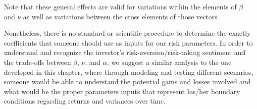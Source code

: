 Note that these general effects are valid for variations within the elements of $\beta$ and $\nu$ as well as variations between the cross elements of those vectors.

Nonetheless, there is no standard or scientific procedure to determine the exactly coefficients that someone should use as inputs for our risk parameters. In order to understand and recognize the investor's risk-aversion/risk-taking sentiment and the trade-offs between $\beta$, $\nu$, and $\alpha$, we suggest a similar analysis to the one developed in this chapter, where through modeling and testing different scenarios, someone would be able to understand the potential gains and losses involved and what would be the proper parameters inputs that represent his/her boundary conditions regarding returns and variances over time.

\vfill
